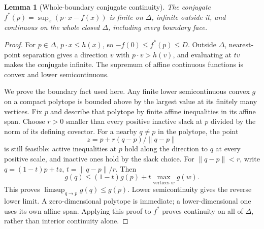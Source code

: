 \documentclass[11pt]{article}
\newtheorem{lemma}[theorem]{Lemma}
\begin{document}
\begin{lemma}[Whole-boundary conjugate continuity]\label{boundary}
The conjugate $f^*(p)=\sup_x(p\cdot x-f(x))$ is finite on $\Delta$, infinite outside it, and continuous on the whole closed $\Delta$, including every boundary face.
\end{lemma}
\begin{proof}
For $p\in\Delta$, $p\cdot x\leq h(x)$, so $-f(0)\leq f^*(p)\leq D$. Outside $\Delta$, nearest-point separation gives a direction $v$ with $p\cdot v>h(v)$, and evaluating at $tv$ makes the conjugate infinite. The supremum of affine continuous functions is convex and lower semicontinuous.

We prove the boundary fact used here. Any finite lower semicontinuous convex $g$ on a compact polytope is bounded above by the largest value at its finitely many vertices. Fix $p$ and describe that polytope by finite affine inequalities in its affine span. Choose $r>0$ smaller than every positive inactive slack at $p$ divided by the norm of its defining covector. For a nearby $q\ne p$ in the polytope, the point
\[
 z=p+r(q-p)/\|q-p\|
\]
is still feasible: active inequalities at $p$ hold along the direction to $q$ at every positive scale, and inactive ones hold by the slack choice. For $\|q-p\|<r$, write $q=(1-t)p+tz$, $t=\|q-p\|/r$. Then
\[
 g(q)\leq(1-t)g(p)+t\max_{\text{vertices }w}g(w).
\]
This proves $\limsup_{q\to p}g(q)\leq g(p)$. Lower semicontinuity gives the reverse lower limit. A zero-dimensional polytope is immediate; a lower-dimensional one uses its own affine span. Applying this proof to $f^*$ proves continuity on all of $\Delta$, rather than interior continuity alone.
\end{proof}
\end{document}
